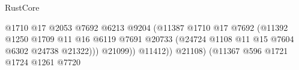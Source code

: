 \begin{lexlean}{RustCore}
\begin{coremodule}
                                                                    @1710
                                                                    @17
                                                                    @2053
                                                                    @7692
                                                                    @6213
                                                                    @9204
                                                                    (@11387
                                                                      @1710
                                                                      @17
                                                                      @7692
                                                                      (@11392
                                                                        @1250
                                                                        @1709
                                                                        @11
                                                                        @16
                                                                        @6119
                                                                        @7691
                                                                        @20733
                                                                        (@24724
                                                                          @1108
                                                                          @11
                                                                          @15
                                                                          @7604
                                                                          @6302
                                                                          @24738
                                                                          @21322)))
                                                                    @21099))
                                                                @11412))
                                                            @21108)
                                                          (@11367
                                                            @596
                                                            @1721
                                                            @1724
                                                            @1261
                                                            @7720

\end{coremodule}
\end{lexlean}
